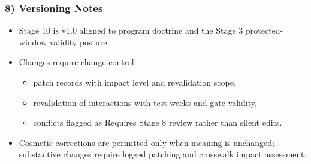\documentclass[10pt]{article}
\begin{document}
\subsubsection*{8) Versioning Notes}

\begin{itemize}
\item Stage 10 is v1.0 aligned to program doctrine and the Stage 3 protected-window validity posture.
\item Changes require change control:
  \begin{itemize}
  \item patch records with impact level and revalidation scope,
  \item revalidation of interactions with test weeks and gate validity,
  \item conflicts flagged as Requires Stage 8 review rather than silent edits.
  \end{itemize}
\item Cosmetic corrections are permitted only when meaning is unchanged; substantive changes require logged patching and crosswalk impact assessment.
\end{itemize}
\end{document}
